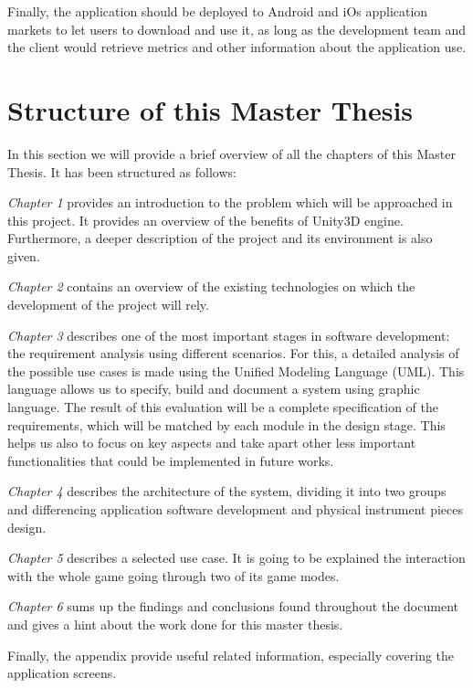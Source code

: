 Finally, the application should be deployed to Android and iOs application markets to let users to download and use it, as long as the development team and the client would retrieve metrics and other information about the application use.


\section{Structure of this Master Thesis}

In this section we will provide a brief overview of all the chapters of this Master Thesis. It
has been structured as follows:

\textit{Chapter 1} provides an introduction to the problem which will be approached in this project. It provides an overview of the benefits of Unity3D engine. Furthermore, a deeper description of the project and its environment is also given.

\textit{Chapter 2} contains an overview of the existing technologies on which the development of the project will rely.

\textit{Chapter 3} describes one of the most important stages in software development: the requirement analysis using different scenarios. For this, a detailed analysis of the possible use cases is made using the Unified Modeling Language (UML). This language allows us to specify, build and document a system using graphic language.
The result of this evaluation will be a complete specification of the requirements, which will be matched by each module in the design stage. This helps us also to focus on key aspects and take apart other less important functionalities that could be implemented in future works.

\textit{Chapter 4} describes the architecture of the system, dividing it into two groups and differencing application software development and physical instrument pieces design.

\textit{Chapter 5} describes a selected use case. It is going to be explained the interaction with the whole game going through two of its game modes.

\textit{Chapter 6} sums up the findings and conclusions found throughout the document and gives a hint about the work done for this master thesis.

Finally, the appendix provide useful related information, especially covering the application screens.